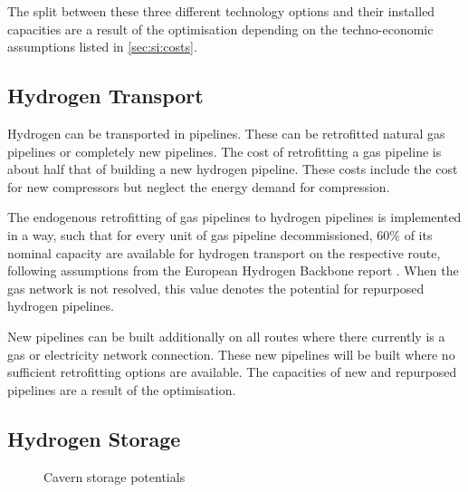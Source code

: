 The split between these three different technology
options and their installed capacities are a result of the optimisation
depending on the techno-economic assumptions listed in \cref{sec:si:costs}.

\subsection{Hydrogen Transport}
\label{sec:si:h2:transport}

Hydrogen can be transported in pipelines. These can be retrofitted natural gas
pipelines or completely new pipelines. The cost of retrofitting a gas pipeline
is about half that of building a new hydrogen pipeline. These costs include the
cost for new compressors but neglect the energy demand for compression.

The endogenous retrofitting of gas pipelines to hydrogen pipelines is
implemented in a way, such that for every unit of gas pipeline decommissioned,
60\% of its nominal capacity are available for hydrogen transport on the
respective route, following assumptions from the European Hydrogen Backbone
report . When the gas network is not resolved, this
value denotes the potential for repurposed hydrogen pipelines.

New pipelines can be built additionally on all routes where there currently is a
gas or electricity network connection. These new pipelines will be built where
no sufficient retrofitting options are available. The capacities of new and
repurposed pipelines are a result of the optimisation.

\subsection{Hydrogen Storage}
\label{sec:si:h2:storage}

\begin{figure}
    \centering
    \caption{Cavern storage potentials}
    \label{fig:clustered-caverns}
\end{figure}

